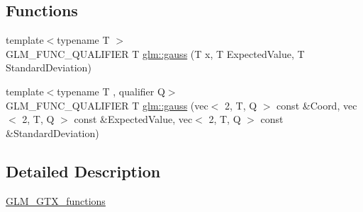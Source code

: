 \subsection*{Functions}
\begin{DoxyCompactItemize}
\item 
{\footnotesize template$<$typename T $>$ }\\G\+L\+M\+\_\+\+F\+U\+N\+C\+\_\+\+Q\+U\+A\+L\+I\+F\+I\+ER T \hyperlink{group__gtx__functions_ga0b50b197ff74261a0fad90f4b8d24702}{glm\+::gauss} (T x, T Expected\+Value, T Standard\+Deviation)
\item 
{\footnotesize template$<$typename T , qualifier Q$>$ }\\G\+L\+M\+\_\+\+F\+U\+N\+C\+\_\+\+Q\+U\+A\+L\+I\+F\+I\+ER T \hyperlink{group__gtx__functions_gad19ec8754a83c0b9a8dc16b7e60705ab}{glm\+::gauss} (vec$<$ 2, T, Q $>$ const \&Coord, vec$<$ 2, T, Q $>$ const \&Expected\+Value, vec$<$ 2, T, Q $>$ const \&Standard\+Deviation)
\end{DoxyCompactItemize}


\subsection{Detailed Description}
\hyperlink{group__gtx__functions}{G\+L\+M\+\_\+\+G\+T\+X\+\_\+functions} 